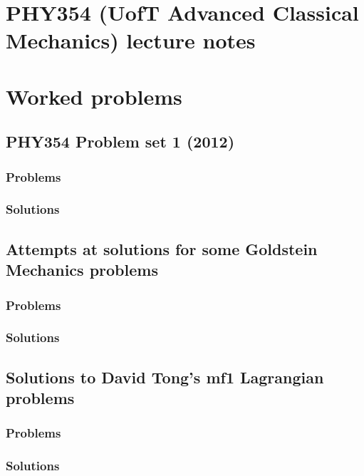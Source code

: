 \part{PHY354 (UofT Advanced Classical Mechanics) lecture notes}
   
   
   
   

\part{Worked problems}
   \chapter{PHY354 Problem set 1 (2012)}
      \section{Problems}
         
      \section{Solutions}
         \shipoutAnswer
   \chapter{Attempts at solutions for some Goldstein Mechanics problems}
      \section{Problems}
          
      \section{Solutions}
         \shipoutAnswer
   \chapter{Solutions to David Tong's mf1 Lagrangian problems}
      \section{Problems}
         
      \section{Solutions}
         \shipoutAnswer
